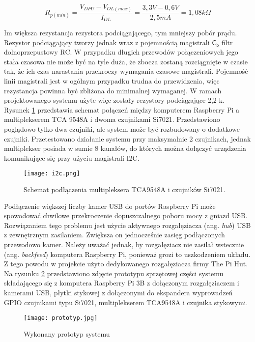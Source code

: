 \documentclass[a4paper,11pt,twoside]{article}
\begin{document}
\begin{equation} \label{pullup}
R_{p(min)} = \frac{V_{DPU} - V_{OL(max)}}{I_{OL}} = \frac{3,3 V - 0,6 V}{2,5 mA} = 1,08 k\Omega  
\end{equation} 

Im większa rezystancja rezystora podciągającego, tym mniejszy pobór prądu. Rezystor podciągający tworzy jednak wraz z pojemnością magistrali $\mathsf{C_{b}}$ filtr dolnoprzepustowy RC. W przypadku długich przewodów połączeniowych jego stała czasowa nie może być na tyle duża, że zbocza zostaną rozciągnięte w czasie tak, że ich czas narastania przekroczy wymagania czasowe magistrali. Pojemność linii magistrali jest w ogólnym przypadku trudna do przewidzenia, więc rezystancja powinna być zbliżona do minimalnej wymaganej. W ramach projektowanego systemu użyte więc zostały rezystory podciągające 2,2 k\textOmega. Rysunek \ref{fig: i2c_schemat} przedstawia schemat połączeń między komputerem Raspberry Pi a multiplekserem TCA 9548A i dwoma czujnikami Si7021. Przedstawiono poglądowo tylko dwa czujniki, ale system może być rozbudowany o dodatkowe czujniki. Przetestowano działanie systemu przy maksymalnie 2 czujnikach, jednak multiplekser posiada w sumie 8 kanałów, do których można dołączyć urządzenia komunikujące się przy użyciu magistrali I2C.

\begin{figure}[h]
\texttt{[image: i2c.png]}
\caption{Schemat podłączenia multipleksera TCA9548A i czujników Si7021.}
\label{fig: i2c_schemat}
\end{figure}

Podłączenie większej liczby kamer USB do portów Raspberry Pi może spowodować chwilowe przekroczenie dopuszczalnego poboru mocy z gniazd USB. Rozwiązaniem tego problemu jest użycie aktywnego rozgałęziacza (ang. \textit{hub}) USB z zewnętrznym zasilaniem. Zwiększa on jednocześnie zasięg podłączonych przewodowo kamer. Należy uważać jednak, by rozgałęziacz nie zasilał wstecznie (ang. \textit{backfeed}) komputera Raspberry Pi, ponieważ grozi to uszkodzeniem układu. Z tego powodu w projekcie użyto dedykowanego rozgałęziacza firmy The Pi Hut. Na rysunku \ref{fig: prototyp} przedstawiono zdjęcie prototypu sprzętowej części systemu składającego się z komputera Raspberry Pi 3B z dołączonym rozgałęziaczem i kamerami USB, płytki stykowej z dołączonymi do ekspandera wyprowadzeń GPIO czujnikami typu Si7021, multiplekserem TCA9548A i czujnika stykowymi.
\begin{figure}[h]
\begin{center}
\texttt{[image: prototyp.jpg]}
\caption{Wykonany prototyp systemu}
\label{fig: prototyp}
\end{center}
\end{figure}
\end{document}
